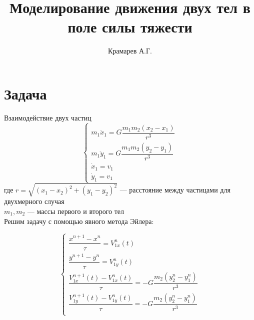 
\title{Моделирование движения двух тел в поле силы тяжести}
\author{Крамарев А.Г.}

\maketitle %

\section{Задача}

Взаимодействие двух частиц
\begin{equation}
\label{eq:main}
\begin{cases}
m_1 \ddot{x}_1 = G \dfrac{ m_1 m_2 (x_2 - x_1) }{r^3} \\ 
m_1 \ddot{y}_1 = G \dfrac{ m_1 m_2 (y_2 - y_1) }{r^3} \\ 
\dot{x}_1 = v_1 \\
\dot{y}_1 = v_1
\end{cases}
\end{equation}
где $r = \sqrt{(x_1 - x_2)^2 + (y_1 - y_2)^2}$ --- расстояние между частицами для двухмерного случая \\
$m_1, m_2$ --- массы первого и второго тел \\

Решим задачу с помощью явного метода Эйлера:

\begin{equation}
\begin{cases}

    \dfrac{x^{n+1}-x^n}{\tau} = V_{1x}^n(t) \\[1em]
    \dfrac{y^{n+1}-y^n}{\tau} = V_{1y}^n(t) \\[1em]
    
    \dfrac{V_{1x}^{n+1}(t) - V_{1x}^n(t)}{\tau} = -G\dfrac{m_2(y_2^n - y_1^n)}{r^3} \\[1em]
    \dfrac{V_{1y}^{n+1}(t) - V_{1y}^n(t)}{\tau} = -G\dfrac{m_2(y_2^n - y_1^n)}{r^3} \\

\end{cases}
\end{equation}



